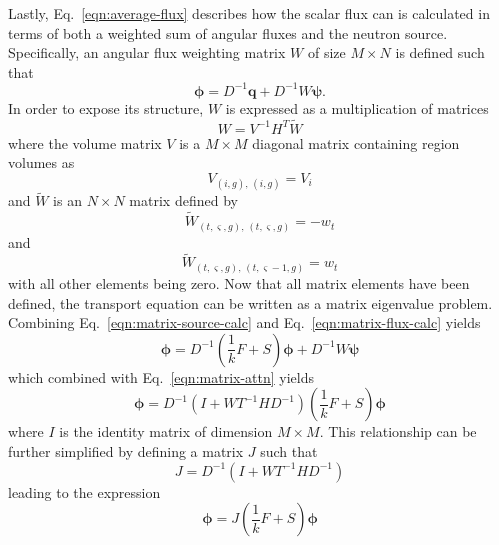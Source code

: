 Lastly, Eq.~\ref{eqn:average-flux} describes how the scalar flux can is calculated in terms of both a weighted sum of angular fluxes and the neutron source. Specifically, an angular flux weighting matrix $W$ of size $M \times N$ is defined such that
\begin{equation}
\boldsymbol{\phi} = D^{-1}\mathbf{q} + D^{-1} W \boldsymbol{\psi}.
\label{eqn:matrix-flux-calc}
\end{equation}
In order to expose its structure, $W$ is expressed as a multiplication of matrices
\begin{equation}
W = V^{-1} H^T \tilde{W}
\end{equation}
where the volume matrix $V$ is a $M \times M$ diagonal matrix containing region volumes as
\begin{equation}
V_{\left(i, g\right), \, \left(i, g\right)} = V_i
\end{equation}
and $\tilde{W}$ is an $N \times N$ matrix defined by
\begin{equation}
\tilde{W}_{\left(t,\varsigma,g\right), \, \left(t, \varsigma, g\right)} = -w_{t}
\end{equation}
and
\begin{equation}
\tilde{W}_{\left(t,\varsigma,g\right), \, \left(t, \varsigma-1, g\right)} = w_{t}
\end{equation}
with all other elements being zero. Now that all matrix elements have been defined, the transport equation can be written as a matrix eigenvalue problem. Combining Eq.~\ref{eqn:matrix-source-calc} and Eq.~\ref{eqn:matrix-flux-calc} yields
\begin{equation}
\boldsymbol{\phi} = D^{-1} \left(\frac{1}{k} F + S \right) \boldsymbol{\phi} + D^{-1} W \boldsymbol{\psi}
\end{equation}
which combined with Eq.~\ref{eqn:matrix-attn} yields
\begin{equation}
\boldsymbol{\phi} = D^{-1}\left( I + W T^{-1} H D^{-1}\right) \left(\frac{1}{k} F + S \right) \boldsymbol{\phi}
\label{eqn:moc-matrix-form}
\end{equation}
where $I$ is the identity matrix of dimension $M \times M$. This relationship can be further simplified by defining a matrix $J$ such that
\begin{equation}
J = D^{-1}\left( I + W T^{-1} H D^{-1}\right)
\end{equation}
leading to the expression
\begin{equation}
\boldsymbol{\phi} = J \left(\frac{1}{k} F + S \right) \boldsymbol{\phi}
\end{equation}
